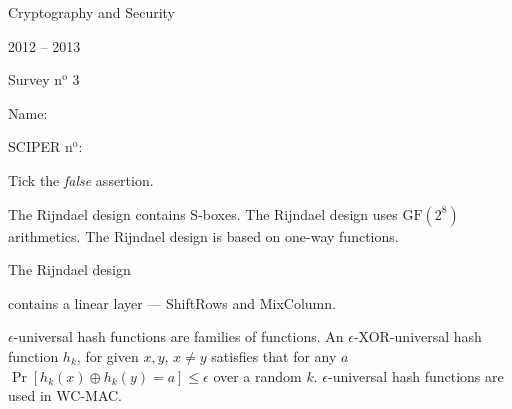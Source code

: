 \documentclass[11pt,a4paper]{report}
\begin{document}

\begin{center}
\sf
  \Large{Cryptography and Security}

  \vspace{0.3cm}
  \Large{2012 -- 2013}

  \vspace{0.3cm}
  \Large{Survey n$^{\text{o}}$ 3}

  \vspace{0.5cm}
\end{center}

\hfill{Name:~}{\vrule width 7cm height 0.4pt}

\bigskip

\hfill{SCIPER n$^{\text{o}}$:~}{\vrule width 7cm height 0.4pt}

\begin{comment}
 \question[]{}
 {}
 {}
 {}
 {}
\end{comment}



 
 
  \question[3]   			
  
  	
  		
  		
  		     
  		     	  
  		     	  {Tick the \emph{
  		     	  false} assertion.} 
  		     	  
  		     	  {The Rijndael design contains S-boxes.}
 		{The Rijndael design uses $\text{GF}(2^8)$ arithmetics.} {
 		The Rijndael design is based on one-way functions.}
 	  		{The Rijndael design
 	  		
 	  		
 	  		
 	  		
 	  		
 	  		 contains a linear layer --- ShiftRows and MixColumn.}
 						      
 					      

	
 {$\epsilon$-universal hash functions are families of functions.}
 {An $\epsilon$-XOR-universal hash function $h_k$, for given $x,y$, $x \neq
	 y$ satisfies that for any $a$
 $\Pr[h_k(x)\oplus h_k(y) = a] \leq \epsilon$
 over a random $k$.}
 {$\epsilon$-universal hash functions are used in WC-MAC.}
\end{document}
